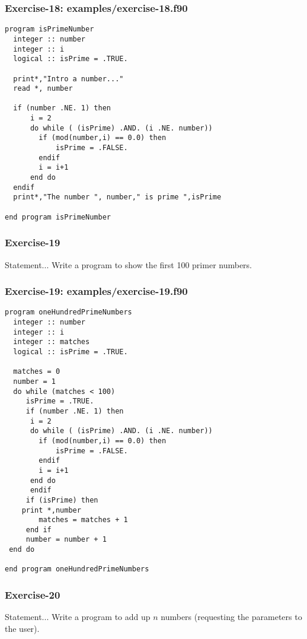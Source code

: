 \documentclass[xcolor=dvipsnames,dvip,notes=show,table]{beamer}
\begin{document}
\begin{frame}[fragile]
\frametitle{Exercise-18: examples/exercise-18.f90}
\scriptsize
\begin{lstlisting}
program isPrimeNumber
  integer :: number
  integer :: i
  logical :: isPrime = .TRUE.
  
  print*,"Intro a number..."
  read *, number
  
  if (number .NE. 1) then 
	  i = 2
	  do while ( (isPrime) .AND. (i .NE. number)) 
		if (mod(number,i) == 0.0) then
			isPrime = .FALSE.
		endif
	    i = i+1
	  end do 
  endif
  print*,"The number ", number," is prime ",isPrime
 
end program isPrimeNumber
\end{lstlisting}
\end{frame}


\begin{frame}[fragile]
\frametitle{Exercise-19}
\begin{block}{Statement...}
Write a program to show the first 100 primer numbers.
\end{block}

\end{frame}


\begin{frame}[fragile]
\frametitle{Exercise-19: examples/exercise-19.f90}
\tiny
\begin{lstlisting}
program oneHundredPrimeNumbers
  integer :: number
  integer :: i
  integer :: matches
  logical :: isPrime = .TRUE.
  
  matches = 0
  number = 1  
  do while (matches < 100)
     isPrime = .TRUE.
     if (number .NE. 1) then 
	  i = 2	 
	  do while ( (isPrime) .AND. (i .NE. number)) 
		if (mod(number,i) == 0.0) then
			isPrime = .FALSE.
		endif
	    i = i+1
	  end do 
      endif
     if (isPrime) then
	print *,number
        matches = matches + 1
     end if
     number = number + 1
 end do
 
end program oneHundredPrimeNumbers
\end{lstlisting}
\end{frame}






\begin{frame}[fragile]
\frametitle{Exercise-20}
\begin{block}{Statement...}
Write a program to add up $n$ numbers (requesting the parameters to the user).
\end{block}

\end{frame}
\end{document}

